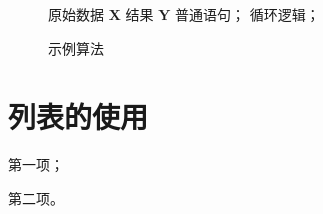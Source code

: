 \begin{figure}
    \centering
    \begin{minipage}{0.75\linewidth}
        \begin{algorithm}[H]
            \caption{示例算法}
            \label{alg-1}
            \begin{algorithmic}[1]
                \Require 原始数据 $\mathbf{X}$
                \Ensure 结果 $\mathbf{Y}$
                \State 普通语句；
                    \State 循环逻辑；
                \EndFor
            \end{algorithmic}
        \end{algorithm}
    \end{minipage}
\end{figure}

\section{列表的使用}

\begin{asparaenum}[(1)]
    \item 第一项；
    \item 第二项。
\end{asparaenum}


\let\cleardoublepage\clearpage



